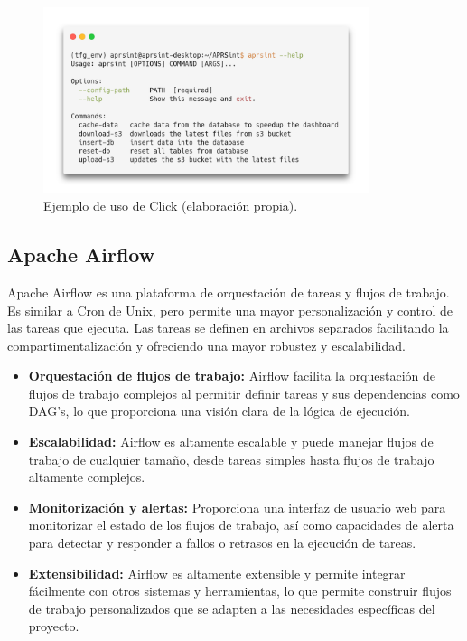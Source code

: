 \begin{figure}[!h]
	\centering
	\includegraphics[width=0.85\textwidth]{Imagenes/Chapter_4/click_help.png}
	\caption[Ejemplo de uso de Click.]{Ejemplo de uso de Click (elaboración propia).}
	\label{fig:click-example}
\end{figure}

\subsection{Apache Airflow}
Apache Airflow es una plataforma de orquestación de tareas y flujos de trabajo. Es similar a Cron de Unix, pero permite una mayor personalización y control de las tareas que ejecuta. Las tareas se definen en archivos separados facilitando la compartimentalización y ofreciendo una mayor robustez y escalabilidad.
\begin{itemize}
	\item \textbf{Orquestación de flujos de trabajo:} Airflow facilita la orquestación de flujos de trabajo complejos al permitir definir tareas y sus dependencias como DAG's, lo que proporciona una visión clara de la lógica de ejecución.
	\item \textbf{Escalabilidad:} Airflow es altamente escalable y puede manejar flujos de trabajo de cualquier tamaño, desde tareas simples hasta flujos de trabajo altamente complejos.
	\item \textbf{Monitorización y alertas:} Proporciona una interfaz de usuario web para monitorizar el estado de los flujos de trabajo, así como capacidades de alerta para detectar y responder a fallos o retrasos en la ejecución de tareas.
	\item \textbf{Extensibilidad:} Airflow es altamente extensible y permite integrar fácilmente con otros sistemas y herramientas, lo que permite construir flujos de trabajo personalizados que se adapten a las necesidades específicas del proyecto.
\end{itemize}

